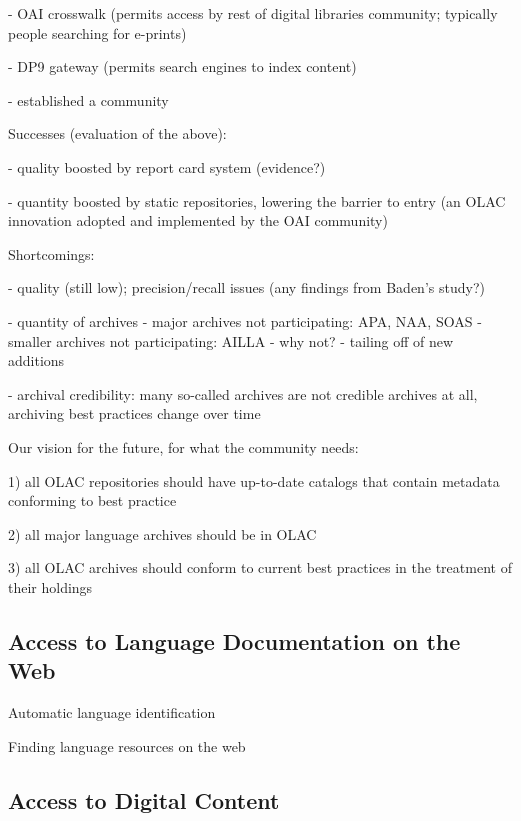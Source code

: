- OAI crosswalk (permits access by rest of digital libraries
    community; typically people searching for e-prints)

- DP9 gateway (permits search engines to index content)

- established a community

\vspace{1in}

Successes (evaluation of the above):

- quality boosted by report card system (evidence?)

- quantity boosted by static repositories, lowering the barrier to entry
  (an OLAC innovation adopted and implemented by the OAI community)

\vspace{1in}

Shortcomings:

- quality (still low); precision/recall issues (any findings from
    Baden's study?)

- quantity of archives
  - major archives not participating: APA, NAA, SOAS
  - smaller archives not participating: AILLA
  - why not?
  - tailing off of new additions

- archival credibility:
    many so-called archives are not credible archives at all,
    archiving best practices change over time

\vspace{1in}

Our vision for the future, for what the community needs:

1) all OLAC repositories should have up-to-date catalogs
   that contain metadata conforming to best practice

2) all major language archives should be in OLAC

3) all OLAC archives should conform to current best practices
    in the treatment of their holdings

\vspace{1in}

\subsection{Access to Language Documentation on the Web}

Automatic language identification
\citep{HughesBaldwin06lrec}

Finding language resources on the web
\citep{BaldwinBird06}

\vspace{1in}

\subsection{Access to Digital Content}

\vspace{1in}

